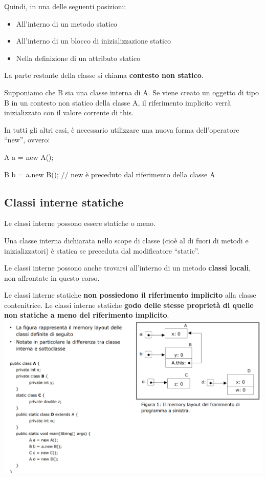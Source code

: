 \documentclass[10pt]{article}
\begin{document}
Quindi, in una delle seguenti posizioni:
\begin{itemize}
    \item All’interno di un metodo statico
    \item All’interno di un blocco di inizializzazione statico
    \item Nella definizione di un attributo statico
\end{itemize}
La parte restante della classe si chiama \textbf{contesto non statico}.

Supponiamo che B sia una classe interna di A.
Se viene creato un oggetto di tipo B in un contesto non statico della classe A, il riferimento implicito 
verrà inizializzato con il valore corrente di this.

In tutti gli altri casi, è necessario utilizzare una nuova forma dell'operatore “new”, ovvero:

A a = new A();

B b = a.new B(); // new è preceduto dal riferimento della classe A
\subsection{Classi interne statiche}
Le classi interne possono essere statiche o meno.

Una classe interna dichiarata nello scope di classe (cioè al di fuori di metodi e inizializzatori) è statica 
se preceduta dal modificatore “static”.

Le classi interne possono anche trovarsi all'interno di un metodo \textbf{classi locali}, non affrontate in questo corso.

Le classi interne statiche \textbf{non possiedono il riferimento implicito} alla classe contenitrice.
Le classi interne statiche \textbf{godo delle stesse proprietà di quelle non statiche a meno del  riferimento implicito}.\\
\includegraphics[scale=0.6]{Immagini/classi_interne.png}
\end{document}
